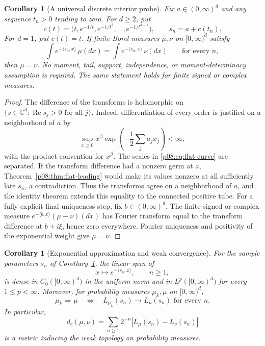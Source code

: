 \documentclass[11pt,letterpaper]{article}
\newtheorem{corollary}[theorem]{Corollary}
\theoremstyle{definition}
\theoremstyle{remark}
\renewcommand{\Re}{\operatorname{Re}}
\newcommand{\1}{\mathbf 1}
\begin{document}
\begin{corollary}[A universal discrete interior probe]
\label{p08:cor:flat-laplace}
Fix $a\in(0,\infty)^d$ and any sequence $t_n>0$ tending to zero.
For $d\ge2$, put
\begin{equation}
 c(t)=\bigl(t,e^{-1/t},e^{-1/t^2},\ldots,e^{-1/t^{d-1}}\bigr),
 \qquad s_n=a+c(t_n).
 \label{p08:eq:flat-curve}
\end{equation}
For $d=1$, put $c(t)=t$.
If finite Borel measures $\mu,\nu$ on $[0,\infty)^d$ satisfy
\[
 \int e^{-\langle s_n,x\rangle}\,\mu(dx)
 =\int e^{-\langle s_n,x\rangle}\,\nu(dx)
 \qquad\text{for every }n,
\]
then $\mu=\nu$.  No moment, tail, support, independence, or
moment-determinacy assumption is required.  The same statement holds
for finite signed or complex measures.
\end{corollary}

\begin{proof}
The difference of the transforms is holomorphic on
$\{s\in\mathbb C^d:\Re s_j>0\text{ for all }j\}$.
Indeed, differentiation of every order is justified on a neighborhood
of $a$ by
\[
 \sup_{x\ge0}x^\beta
       \exp\left(-\frac12\sum_j a_jx_j\right)<\infty,
\]
with the product convention for $x^\beta$.
The scales in \eqref{p08:eq:flat-curve} are separated.
If the transform difference had a nonzero germ at $a$,
Theorem~\ref{p08:thm:flat-leading} would make its values nonzero at all
sufficiently late $s_n$, a contradiction.  Thus the transforms agree
on a neighborhood of $a$, and the identity theorem extends this
equality to the connected positive tube.
For a fully explicit final uniqueness step, fix $b\in(0,\infty)^d$.
The finite signed or complex measure
$e^{-\langle b,x\rangle}(\mu-\nu)(dx)$ has Fourier transform
equal to the transform difference at $b+i\xi$, hence zero everywhere.
Fourier uniqueness and positivity of the exponential weight give
$\mu=\nu$.
\end{proof}

\begin{corollary}[Exponential approximation and weak convergence]
\label{p08:cor:flat-density}
For the sample parameters $s_n$ of Corollary~\ref{p08:cor:flat-laplace},
the linear span of
\[
 x\longmapsto e^{-\langle s_n,x\rangle},\qquad n\ge1,
\]
is dense in $C_0([0,\infty)^d)$ in the uniform norm and in
$L^p([0,\infty)^d)$ for every $1\le p<\infty$.
Moreover, for probability measures $\mu_k,\mu$ on $[0,\infty)^d$,
\[
 \mu_k\Rightarrow\mu
 \quad\Longleftrightarrow\quad
 L_{\mu_k}(s_n)\longrightarrow L_\mu(s_n)
 \text{ for every }n.
\]
In particular,
\[
 d_c(\mu,\nu)=\sum_{n\ge1}2^{-n}
           |L_\mu(s_n)-L_\nu(s_n)|
\]
is a metric inducing the weak topology on probability measures.
\end{corollary}
\end{document}
